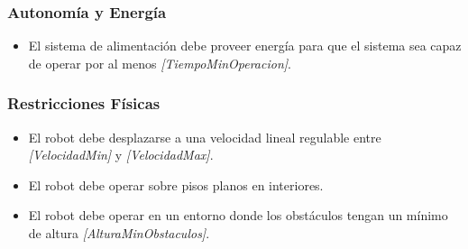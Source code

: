 \subsubsection{Autonomía y Energía}
\begin{itemize}
    \item El sistema de alimentación debe proveer energía para que el sistema sea capaz de operar por al menos \textit{[TiempoMinOperacion]}.
\end{itemize}

\subsubsection{Restricciones Físicas}
\begin{itemize}
    \item El robot debe desplazarse a una velocidad lineal regulable entre \textit{[VelocidadMin]} y \textit{[VelocidadMax]}.
    \item El robot debe operar sobre pisos planos en interiores.
    \item El robot debe operar en un entorno donde los obstáculos tengan un mínimo de altura \textit{[AlturaMinObstaculos]}.
\end{itemize}